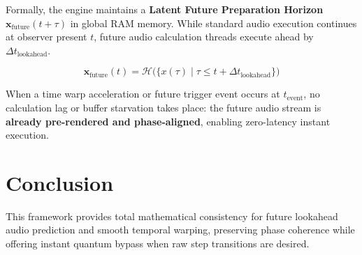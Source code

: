 \documentclass[11pt,a4paper]{article}
\begin{document}
Formally, the engine maintains a \textbf{Latent Future Preparation Horizon} $\mathbf{x}_{\text{future}}(t + \tau)$ in global RAM memory. While standard audio execution continues at observer present $t$, future audio calculation threads execute ahead by $\Delta t_{\text{lookahead}}$.

\begin{equation}
\mathbf{x}_{\text{future}}(t) = \mathcal{H}\Big( \{x(\tau) \mid \tau \le t + \Delta t_{\text{lookahead}}\} \Big)
\end{equation}

When a time warp acceleration or future trigger event occurs at $t_{\text{event}}$, no calculation lag or buffer starvation takes place: the future audio stream is \textbf{already pre-rendered and phase-aligned}, enabling zero-latency instant execution.

\section{Conclusion}
This framework provides total mathematical consistency for future lookahead audio prediction and smooth temporal warping, preserving phase coherence while offering instant quantum bypass when raw step transitions are desired.
\end{document}
